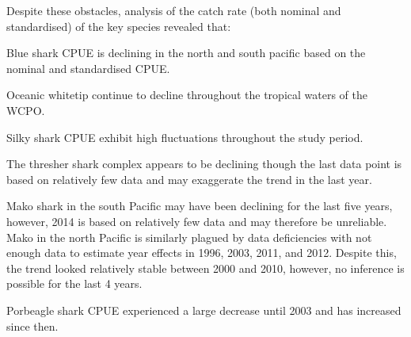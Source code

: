 Despite these obstacles, analysis of the catch rate (both nominal and standardised) of the key species revealed that:

Blue shark CPUE is declining in the north and south pacific based on the nominal and standardised CPUE.

Oceanic whitetip continue to decline throughout the tropical waters of the WCPO.

Silky shark CPUE exhibit high fluctuations throughout the study period.

The thresher shark complex appears to be declining though the last data point is based on relatively few data and may exaggerate the trend in the last year.

Mako shark in the south Pacific may have been declining for the last five years, however, 2014 is based on relatively few data and may therefore be unreliable. Mako in the north Pacific is similarly plagued by data deficiencies with not enough data to estimate year effects in 1996, 2003, 2011, and 2012. Despite this, the trend looked relatively stable between 2000 and 2010, however, no inference is possible for the last 4 years.%

Porbeagle shark CPUE experienced a large decrease until 2003 and has increased since then.


